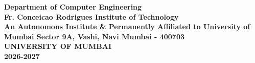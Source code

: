 \begin{titlepage}
{{\bf Department of Computer Engineering \\
\vspace{0.2cm}
\bf {Fr. Conceicao Rodrigues Institute of Technology}\\
\bf{ An Autonomous Institute \& Permanently Affiliated to University of Mumbai}
\bf Sector 9A, Vashi, Navi Mumbai - 400703} \\
{\centering
\hspace{.5cm}
{\centering
{\bf UNIVERSITY OF MUMBAI} \\
\vspace{0.2cm}}
\bf{ 2026-2027} \\
}

}\end{titlepage} 